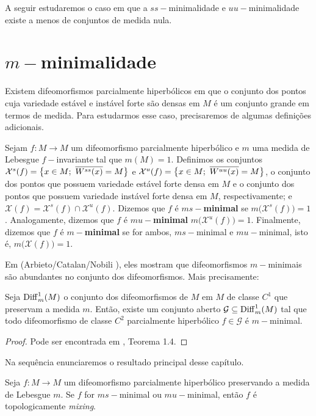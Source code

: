 A seguir estudaremos o caso em que a $ss-$minimalidade e $uu-$minimalidade existe a menos de conjuntos de medida nula.

\section{$m-$minimalidade}

Existem difeomorfismos parcialmente hiperbólicos em que o conjunto dos pontos cuja variedade estável e instável forte são densas em $M$ é um conjunto grande em termos de medida. Para estudarmos esse caso, precisaremos de algumas definições adicionais. 

\begin{definicao} Sejam $f:M\to M$ um difeomorfismo parcialmente hiperbólico e $m$ uma medida de Lebesgue $f-$invariante tal que $m(M)=1$. Definimos os conjuntos $\mathcal{X}^s(f)=\conjunto{x\in M;\ \fecho{W^{ss}(x)}=M}$ e $\mathcal{X}^u(f)=\conjunto{x\in M;\ \fecho{W^{uu}(x)}=M}$, o conjunto dos pontos que possuem variedade estável forte densa em $M$ e o conjunto dos pontos que possuem variedade instável forte densa em $M$, respectivamente; e $\mathcal{X}(f)=\mathcal{X}^s(f)\cap \mathcal{X}^u(f)$. Dizemos que $f$ é \textbf{$ms-$minimal} se $m\big(\mathcal{X}^s(f)\big)=1$. Analogamente, dizemos que $f$ é \textbf{$mu-$minimal} $m\big(\mathcal{X}^u(f)\big)=1$. Finalmente, dizemos que $f$ é \textbf{$m-$minimal} se for ambos, $ms-$minimal e $mu-$minimal, isto é, $m\big(\mathcal{X}(f)\big)=1$.
\end{definicao}

Em (Arbieto/Catalan/Nobili \cite{art}), eles mostram que difeomorfismos $m-$minimais são abundantes no conjunto dos difeomorfismos. Mais precisamente:

\begin{teorema} Seja $\operatorname{Diff}^1_m(M)$ o conjunto dos difeomorfismos de $M$ em $M$ de classe $C^1$ que preservam a medida $m$. Então, existe um conjunto aberto $\mathcal{G}\subseteq\operatorname{Diff}^1_m(M)$ tal que todo difeomorfismo de classe $C^2$ parcialmente hiperbólico $f\in \mathcal{G}$ é $m-$minimal.
\end{teorema}

\begin{proof} Pode ser encontrada em \cite{art}, Teorema 1.4.
\end{proof}

Na sequência enunciaremos o resultado principal desse capítulo.

\begin{teorema}\label{mminimal} Seja $f:M\to M$ um difeomorfismo parcialmente hiperbólico preservando a medida de Lebesgue $m$. Se $f$ for $ms-$minimal ou $mu-$minimal, então $f$ é topologicamente \textit{mixing}.
\end{teorema}

